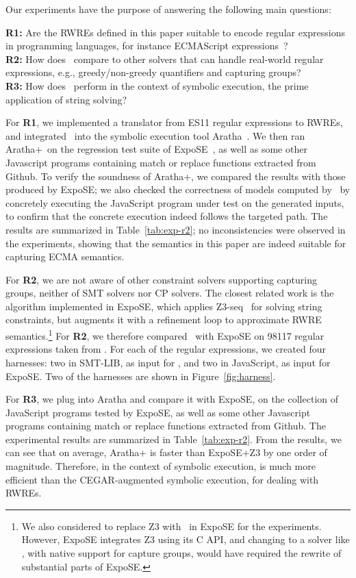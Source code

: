 Our experiments have the purpose of answering the following main questions:

\medskip
\noindent
\textbf{R1:} Are the  RWREs defined in this paper
suitable to encode regular expressions in programming languages,
for instance ECMAScript expressions~\cite{ECMAScript11}?
\\
\textbf{R2:} How does \ostrich\ compare to other solvers that can
handle real-world regular expressions, e.g., greedy/non-greedy
quantifiers and capturing groups?
\\
\textbf{R3:} How does \ostrich\ perform in the context of symbolic execution,
the prime application of string solving?

\medskip
For \textbf{R1}, we implemented a translator from ES11 regular
expressions to RWREs, and integrated \ostrich\ into the symbolic
execution tool Aratha~\cite{aratha}. We then ran Aratha+\ostrich\ on
the regression test suite of ExpoSE~\cite{DBLP:conf/spin/LoringMK17},
as well as some other Javascript programs containing match or replace
functions extracted from Github. To verify the soundness of
Aratha+\ostrich, we compared the results with those produced by
ExpoSE; we also checked the correctness of models computed by
\ostrich\ by concretely executing the JavaScript program under test on
the generated inputs, to confirm that the concrete execution indeed
follows the targeted path. The results are summarized in Table~\ref{tab:exp-r2};
no inconsistencies were observed in the experiments, showing that the
semantics in this paper are indeed suitable for capturing ECMA
semantics.

For \textbf{R2}, we are not aware of other constraint solvers
supporting capturing groups, neither of SMT solvers nor
CP solvers. %
The closest related work is the algorithm implemented in ExpoSE, which
applies Z3-seq~\cite{Z3} for solving string constraints, but augments
it with a refinement loop to approximate RWRE
semantics.\footnote{We also considered to replace Z3 with \ostrich\ in
  ExpoSE for the experiments. However, ExpoSE integrates Z3 using its
  C API, and changing to a solver like \ostrich, with native support
  for capture groups, would have required the rewrite of substantial
  parts of ExpoSE.}
%
For \textbf{R2}, we therefore compared \ostrich\ with ExpoSE on 98117
regular expressions taken from \cite{DMC+19}. For each of the regular
expressions, we created four harnesses: two in SMT-LIB, as input for
\ostrich, and two in JavaScript, as input for ExpoSE. Two of the
harnesses are shown in Figure~\ref{fig:harness}.

For \textbf{R3}, we plug {\ostrich} into Aratha and compare it with
ExpoSE, on the collection of JavaScript programs tested by ExpoSE, as
well as some other Javascript programs containing match or replace
functions extracted from Github. The experimental results are
summarized in Table~\ref{tab:exp-r2}. From the results, we can see
that on average, Aratha+{\ostrich} is faster than ExpoSE+Z3 by one
order of magnitude. Therefore, in the context of symbolic execution,
{\ostrich} is much more efficient than the CEGAR-augmented symbolic
execution, for dealing with RWREs.
